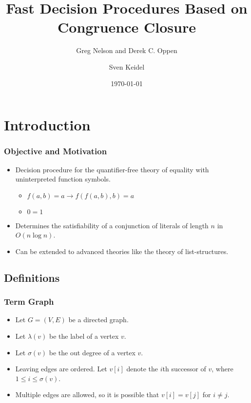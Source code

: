 \documentclass[fleqn,t]{beamer}
\title{Fast Decision Procedures Based on Congruence Closure}
\subtitle{Greg Nelson and Derek C. Oppen}
\author{Sven Keidel}
\date{\today}
\begin{document}
\maketitle

\section{Introduction}

\begin{frame}
  \frametitle{Objective and Motivation}

  \begin{itemize}
    \item Decision procedure for the quantifier-free theory of equality with
      uninterpreted function symbols.
      \begin{itemize}
        \item $f(a,b) = a \rightarrow f(f(a,b),b) = a$
        \item $0 = 1$
      \end{itemize}

    \item Determines the satisfiability of a conjunction of
      literals of length $n$ in $O(n \log n)$.

    \item Can be extended to advanced theories like the theory of
      list-structures.
  \end{itemize}

\end{frame}


\subsection{Definitions}

\begin{frame}
  \frametitle{Term Graph}

  \begin{Definition}
    \begin{itemize}
      \item Let $G = (V,E)$ be a directed graph.
      \item Let $\lambda(v)$ be the label of a vertex $v$.
      \item Let $\sigma(v)$ be the out degree of a vertex $v$.
      \item Leaving edges are ordered. Let $v[i]$ denote the $i$th successor of
        $v$, where $1 \leq i \leq \sigma(v)$.
      \item Multiple edges are allowed, so it is possible that $v[i] = v[j]$ for
        $i \neq j$.
    \end{itemize}
  \end{Definition}

\end{frame}
\end{document}
